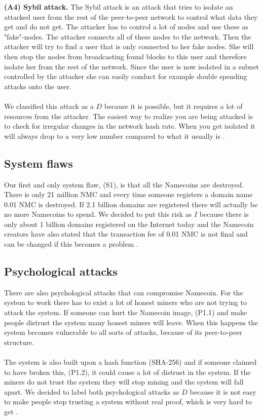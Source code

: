 \documentclass[frame, english]{idamasterthesis}
\begin{document}
\noindent
\textbf{(A4) Sybil attack.} The Sybil attack is an attack that tries to isolate an attacked user from the rest of the peer-to-peer network to control what data they get and do not get. The attacker has to control a lot of nodes and use these as "fake"-nodes. The attacker connects all of these nodes to the network. Then the attacker will try to find a user that is only connected to her fake nodes. She will then stop the nodes from broadcasting found blocks to this user and therefore isolate her from the rest of the network. Since the user is now isolated in a subnet controlled by the attacker she can easily conduct for example double spending attacks onto the user.\\\\
We classified this attack as a $D$ because it is possible, but it requires a lot of resources from the attacker. The easiest way to realize you are being attacked is to check for irregular changes in the network hash rate. When you get isolated it will always drop to a very low number compared to what it usually is \cite{bitcoin-attacks}.
\noindent
\subsection{System flaws} Our first and only system flaw, (S1), is that all the Namecoins are destroyed. There is only 21 million NMC and every time someone registers a domain name 0.01 NMC is destroyed. If 2.1 billion domains are registered there will actually be no more Namecoins to spend. We decided to put this risk as $I$ because there is only about 1 billion domains registered on the Internet today and the Namecoin creators have also stated that the transaction fee of 0.01 NMC is not final and can be changed if this becomes a problem \cite{Namecoin}.

\subsection{Psychological attacks}
There are also psychological attacks that can compromise Namecoin. For the system to work there has to exist a lot of honest miners who are not trying to attack the system. If someone can hurt the Namecoin image, (P1.1) and make people distrust the system many honest miners will leave. When this happens the system becomes vulnerable to all sorts of attacks, because of its peer-to-peer structure. \\\\
The system is also built upon a hash function (SHA-256) and if someone claimed to have broken this, (P1.2), it could cause a lot of distrust in the system. If the miners do not trust the system they will stop mining and the system will fall apart. We decided to label both psychological attacks as $D$ because it is not easy to make people stop trusting a system without real proof, which is very hard to get \cite{bitcoin-attacks}.
\end{document}
